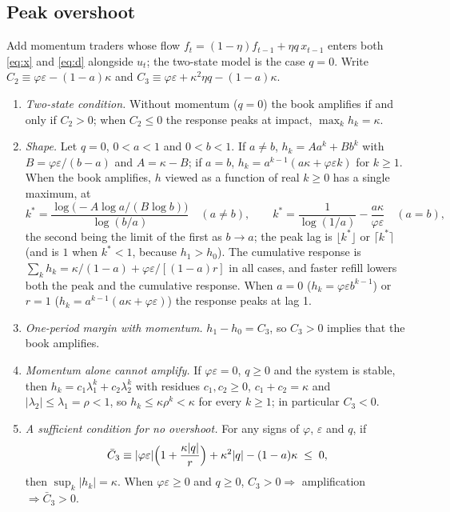 \subsection{Peak overshoot}

Add momentum traders whose flow $f_t=(1-\eta)f_{t-1}+\eta q\,x_{t-1}$ enters both \eqref{eq:x} and \eqref{eq:d} alongside $u_t$; the two-state model is the case $q=0$. Write $C_2\equiv\varphi\varepsilon-(1-a)\kappa$ and $C_3\equiv\varphi\varepsilon+\kappa^2\eta q-(1-a)\kappa$.

\begin{theorem}\label{thm:peak}
\begin{enumerate}[label=(\roman*)]
\item\label{thm:t6} \emph{Two-state condition.} Without momentum ($q=0$) the book amplifies if and only if $C_2>0$; when $C_2\le0$ the response peaks at impact, $\max_kh_k=\kappa$.
\item\label{prop:shape} \emph{Shape.} Let $q=0$, $0<a<1$ and $0<b<1$. If $a\neq b$, $h_k=Aa^k+Bb^k$ with $B=\varphi\varepsilon/(b-a)$ and $A=\kappa-B$; if $a=b$, $h_k=a^{k-1}(a\kappa+\varphi\varepsilon k)$ for $k\ge1$. When the book amplifies, $h$ viewed as a function of real $k\ge0$ has a single maximum, at
\[
k^*=\frac{\log\bigl(-A\log a/(B\log b)\bigr)}{\log(b/a)}\quad(a\neq b),\qquad k^*=\frac1{\log(1/a)}-\frac{a\kappa}{\varphi\varepsilon}\quad(a=b),
\]
the second being the limit of the first as $b\to a$; the peak lag is $\lfloor k^*\rfloor$ or $\lceil k^*\rceil$ (and is $1$ when $k^*<1$, because $h_1>h_0$). The cumulative response is $\sum_kh_k=\kappa/(1-a)+\varphi\varepsilon/[(1-a)r]$ in all cases, and faster refill lowers both the peak and the cumulative response. When $a=0$ ($h_k=\varphi\varepsilon b^{k-1}$) or $r=1$ ($h_k=a^{k-1}(a\kappa+\varphi\varepsilon)$) the response peaks at lag 1.
\item\label{prop:t6m} \emph{One-period margin with momentum.} $h_1-h_0=C_3$, so $C_3>0$ implies that the book amplifies.
\item\label{thm:nomom} \emph{Momentum alone cannot amplify.} If $\varphi\varepsilon=0$, $q\ge0$ and the system is stable, then $h_k=c_1\lambda_1^k+c_2\lambda_2^k$ with residues $c_1,c_2\ge0$, $c_1+c_2=\kappa$ and $|\lambda_2|\le\lambda_1=\rho<1$, so $h_k\le\kappa\rho^k<\kappa$ for every $k\ge1$; in particular $C_3<0$.
\item\label{thm:noover} \emph{A sufficient condition for no overshoot.} For any signs of $\varphi$, $\varepsilon$ and $q$, if
\[
\bar C_3\equiv|\varphi\varepsilon|\Bigl(1+\frac{\kappa|q|}{r}\Bigr)+\kappa^2|q|-(1-a)\kappa\;\le\;0,
\]
then $\sup_k|h_k|=\kappa$. When $\varphi\varepsilon\ge0$ and $q\ge0$, $C_3>0\Rightarrow$ amplification $\Rightarrow\bar C_3>0$.
\end{enumerate}
\end{theorem}


